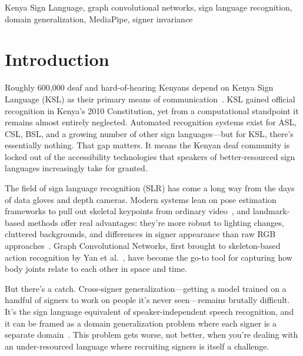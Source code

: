 \documentclass[conference]{IEEEtran}
\begin{document}
\begin{IEEEkeywords}
Kenya Sign Language, graph convolutional networks, sign language recognition, domain generalization, MediaPipe, signer invariance
\end{IEEEkeywords}

\section{Introduction}

Roughly 600,000 deaf and hard-of-hearing Kenyans depend on Kenya Sign Language (KSL) as their primary means of communication~\cite{ai4ksl2024}. KSL gained official recognition in Kenya's 2010 Constitution, yet from a computational standpoint it remains almost entirely neglected. Automated recognition systems exist for ASL, CSL, BSL, and a growing number of other sign languages---but for KSL, there's essentially nothing. That gap matters. It means the Kenyan deaf community is locked out of the accessibility technologies that speakers of better-resourced sign languages increasingly take for granted.

The field of sign language recognition (SLR) has come a long way from the days of data gloves and depth cameras. Modern systems lean on pose estimation frameworks to pull out skeletal keypoints from ordinary video~\cite{robert2023review}, and landmark-based methods offer real advantages: they're more robust to lighting changes, cluttered backgrounds, and differences in signer appearance than raw RGB approaches~\cite{aiman2023}. Graph Convolutional Networks, first brought to skeleton-based action recognition by Yan et al.~\cite{yan2018stgcn}, have become the go-to tool for capturing how body joints relate to each other in space and time.

But there's a catch. Cross-signer generalization---getting a model trained on a handful of signers to work on people it's never seen---remains brutally difficult. It's the sign language equivalent of speaker-independent speech recognition, and it can be framed as a domain generalization problem where each signer is a separate domain~\cite{pu2024signer}. This problem gets worse, not better, when you're dealing with an under-resourced language where recruiting signers is itself a challenge.
\end{document}
